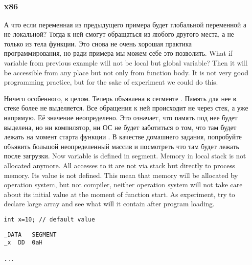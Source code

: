 ﻿\subsection{}

\subsubsection{x86}

\IFRU
{А что если переменная  из предыдущего примера будет глобальной переменной а не локальной? 
Тогда к ней смогут обращаться из любого другого места, а не только из тела функции. 
Это снова не очень хорошая практика программирования, но ради примера мы можем себе это позволить.}
{What if  variable from previous example will not be local but global variable? 
Then it will be accessible from any place but not only from function body. 
It is not very good programming practice, but for the sake of experiment we could do this.}



\IFRU
{Ничего особенного, в целом. Теперь  объявлена в сегменте . 
Память для нее в стеке более не выделяется. Все обращения к ней происходит не через стек, а уже напрямую. 
Её значение неопределено. 
Это означает, что память под нее будет выделена, но ни компилятор, ни ОС не будет заботиться о том, 
что там будет лежать на момент старта функции \main.
В качестве домашнего задания, попробуйте объявить большой неопределенный массив и посмотреть 
что там будет лежать после загрузки.}
{Now  variable is defined in  segment. 
Memory in local stack is not allocated anymore. 
All accesses to it are not via stack but directly to process memory. 
Its value is not defined. 
This mean that memory will be allocated by operation system, but not compiler, 
neither operation system will not take care about its initial value at the moment of 
\main function start.
As experiment, try to declare large array and see what will it contain after 
program loading.}


\begin{lstlisting}
int x=10; // default value
\end{lstlisting}


\begin{lstlisting}
_DATA	SEGMENT
_x	DD	0aH

...
\end{lstlisting}

